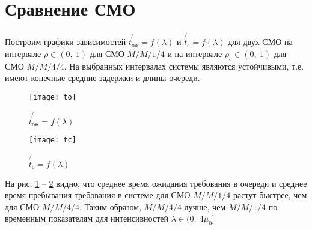 \section{Сравнение СМО}

Построим графики зависимостей $\not{t_\text{ож}} = f(\lambda)$ и $\not{t_\text{c}} = f(\lambda)$ для двух СМО на интервале $\rho \in (0,\ 1)$ для СМО $M/M/1/4$ и на интервале $\rho_c \in (0,\ 1)$ для СМО $M/M/4/4$. На выбранных интервалах системы являются устойчивыми, т.е. имеют конечные средние задержки и длины очереди.

\begin{figure}[H]
	\begin{center}
		\texttt{[image: to]}
		\caption{$\not{t_\text{ож}} = f(\lambda)$}
		\label{pic:to}
	\end{center}
\end{figure}

\begin{figure}[H]
	\begin{center}
		\texttt{[image: tc]}
		\caption{$\not{t_\text{c}} = f(\lambda)$}
		\label{pic:tc}
	\end{center}
\end{figure}

На рис. \ref{pic:to} -- \ref{pic:tc} видно, что среднее время ожидания требования в очереди и среднее время пребывания требования в системе для СМО $M/M/1/4$ растут быстрее, чем для СМО $M/M/4/4$. Таким образом, $M/M/4/4$ лучше, чем $M/M/1/4$ по временным показателям для интенсивностей $\lambda \in (0,\ 4\mu_0]$

